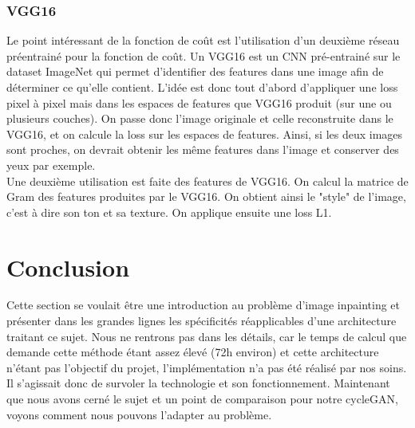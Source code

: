 \subsubsection{VGG16}
Le point intéressant de la fonction de coût est l'utilisation d'un deuxième réseau préentrainé pour la fonction de coût. Un VGG16 est un CNN pré-entrainé sur le dataset ImageNet qui permet d'identifier des features dans une image afin de déterminer ce qu'elle contient. L'idée est donc tout d'abord d'appliquer une loss pixel à pixel mais dans les espaces de features que VGG16 produit (sur une ou plusieurs couches). On passe donc l'image originale et celle reconstruite dans le VGG16, et on calcule la loss sur les espaces de features. Ainsi, si les deux images sont proches, on devrait obtenir les même features dans l'image et conserver des yeux par exemple. \\
Une deuxième utilisation est faite des features de VGG16. On calcul la matrice de Gram des features produites par le VGG16. On obtient ainsi le "style" de l'image, c'est à dire son ton et sa texture. On applique ensuite une loss L1.

\section{Conclusion}
Cette section se voulait être une introduction au problème d'image inpainting et présenter dans les grandes lignes les spécificités réapplicables d'une architecture traitant ce sujet. Nous ne rentrons pas dans les détails, car le temps de calcul que demande cette méthode étant assez élevé (72h environ) et cette architecture n'étant pas l'objectif du projet, l'implémentation n'a pas été réalisé par nos soins. Il s'agissait donc de survoler la technologie et son fonctionnement. Maintenant que nous avons cerné le sujet et un point de comparaison pour notre cycleGAN, voyons comment nous pouvons l'adapter au problème.


